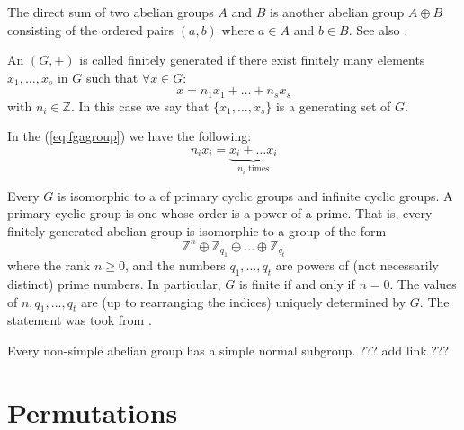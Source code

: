 \begin{appendices}
\begin{definition}
  The direct sum of two abelian groups $A$ and
  $B$ is another abelian group $A \oplus B$ consisting of the ordered
  pairs
  $\left(a, b\right)$ where $a \in A$ and $b \in B$.
  \cite{wiki:directsum}
  See also .
  
  \label{def:directsum}
\end{definition}

\begin{definition}
  An  $(G, +)$ is called finitely generated
  \cite{wiki:fgagroup} 
  if there exist finitely many elements $x_1, \dots, x_s$ in $G$ such that
  $\forall x \in G$:
  \begin{equation}
    x = n_1 x_1 + \dots + n_s x_s
    \label{eq:fgagroup}
  \end{equation}
  with $n_i \in \mathbb{Z}$. In this case we say that $\{x_1, \dots,
  x_s\}$ is a generating set of $G$.

  In the (\ref{eq:fgagroup}) we have the following:
  \[
  n_i x_i = \underbrace{x_i + \dots x_i}_{n_i \text{ times}}
  \]
  \label{def:fgagroup}
\end{definition}

\begin{theorem}
  Every  $G$ is isomorphic to a
   of primary cyclic groups and infinite cyclic
  groups. A primary cyclic group is one whose order is a power of a
  prime. That is, every finitely generated abelian group is isomorphic
  to a group of the form
  \[
  \mathbb{Z}^n \oplus \mathbb{Z}_{q_1} \oplus
  \dots \oplus \mathbb{Z}_{q_t}
  \]
  where the rank $n \ge 0$, and the numbers $q_1, \dots , q_t$ are
  powers of (not 
  necessarily distinct) prime numbers. In particular, $G$ is finite if
  and only if $n = 0$. The values of $n, q_1, \dots , q_t$ are (up to
  rearranging the indices) uniquely determined by $G$. 
  The statement was took from \cite{wiki:fgagroup}.
  \label{thm:fgagroup}
\end{theorem}

\begin{theorem}
  Every non-simple abelian group has a simple normal subgroup.
  ??? add link ???
  \label{thm:simple_subgroup_of_abelian}
\end{theorem}
  
\section{Permutations}


\end{appendices}
